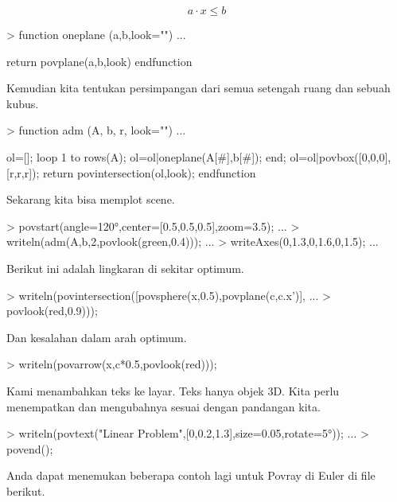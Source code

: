 \documentclass[a4paper,10pt]{article}
\begin{document}
\begin{eulernotebook}
\begin{eulercomment}
\begin{eulercomment}
\begin{eulercomment}
\end{eulercomment}
\begin{eulerformula}
\[
a \cdot x \le b
\]
\end{eulerformula}
\begin{eulerprompt}
> function oneplane (a,b,look="") ...
\end{eulerprompt}
\begin{eulerudf}
    return povplane(a,b,look)
  endfunction
\end{eulerudf}
\begin{eulercomment}
Kemudian kita tentukan persimpangan dari semua setengah ruang dan
sebuah kubus.
\end{eulercomment}
\begin{eulerprompt}
> function adm (A, b, r, look="") ...
\end{eulerprompt}
\begin{eulerudf}
    ol=[];
    loop 1 to rows(A); ol=ol|oneplane(A[#],b[#]); end;
    ol=ol|povbox([0,0,0],[r,r,r]);
    return povintersection(ol,look);
  endfunction
\end{eulerudf}
\begin{eulercomment}
Sekarang kita bisa memplot scene.
\end{eulercomment}
\begin{eulerprompt}
> povstart(angle=120°,center=[0.5,0.5,0.5],zoom=3.5); ...
> writeln(adm(A,b,2,povlook(green,0.4))); ...
> writeAxes(0,1.3,0,1.6,0,1.5); ...
\end{eulerprompt}
\begin{eulercomment}
Berikut ini adalah lingkaran di sekitar optimum.
\end{eulercomment}
\begin{eulerprompt}
> writeln(povintersection([povsphere(x,0.5),povplane(c,c.x')], ...
>   povlook(red,0.9)));
\end{eulerprompt}
\begin{eulercomment}
Dan kesalahan dalam arah optimum.
\end{eulercomment}
\begin{eulerprompt}
> writeln(povarrow(x,c*0.5,povlook(red)));
\end{eulerprompt}
\begin{eulercomment}
Kami menambahkan teks ke layar. Teks hanya objek 3D. Kita perlu
menempatkan dan mengubahnya sesuai dengan pandangan kita.
\end{eulercomment}
\begin{eulerprompt}
> writeln(povtext("Linear Problem",[0,0.2,1.3],size=0.05,rotate=5°)); ...
> povend();
\end{eulerprompt}
\begin{eulercomment}
Anda dapat menemukan beberapa contoh lagi untuk Povray di Euler di
file berikut.


\end{eulercomment}
\end{eulercomment}
\end{eulercomment}
\end{eulernotebook}
\end{document}

